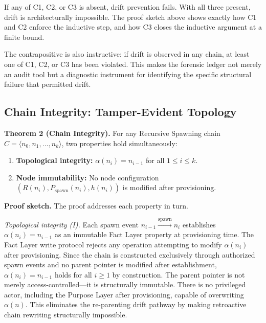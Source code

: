 If any of C1, C2, or C3 is absent, drift prevention fails. With all three present, drift is architecturally impossible. The proof sketch above shows exactly how C1 and C2 enforce the inductive step, and how C3 closes the inductive argument at a finite bound.

The contrapositive is also instructive: if drift is observed in any chain, at least one of C1, C2, or C3 has been violated. This makes the forensic ledger not merely an audit tool but a diagnostic instrument for identifying the specific structural failure that permitted drift.

\subsection{Chain Integrity: Tamper-Evident Topology}
\label{sec:rs-chain-integrity-formal}

\medskip
\noindent\textbf{Theorem 2 (Chain Integrity).} For any Recursive Spawning chain $C = \langle n_0, n_1, \ldots, n_k \rangle$, two properties hold simultaneously:

\begin{enumerate}
    \item[(I)] \textbf{Topological integrity:} $\alpha(n_i) = n_{i-1}$ for all $1 \leq i \leq k$.
    \item[(II)] \textbf{Node immutability:} No node configuration $(R(n_i), P_{\mathrm{spawn}}(n_i), h(n_i))$ is modified after provisioning.
\end{enumerate}

\medskip
\noindent\textbf{Proof sketch.} The proof addresses each property in turn.

\medskip
\textit{Topological integrity (I).} Each spawn event $n_{i-1} \xrightarrow{\mathrm{spawn}} n_i$ establishes $\alpha(n_i) = n_{i-1}$ as an immutable Fact Layer property at provisioning time. The Fact Layer write protocol rejects any operation attempting to modify $\alpha(n_i)$ after provisioning. Since the chain is constructed exclusively through authorized spawn events and no parent pointer is modified after establishment, $\alpha(n_i) = n_{i-1}$ holds for all $i \geq 1$ by construction. The parent pointer is not merely access-controlled---it is structurally immutable. There is no privileged actor, including the Purpose Layer after provisioning, capable of overwriting $\alpha(n)$. This eliminates the re-parenting drift pathway by making retroactive chain rewriting structurally impossible.


